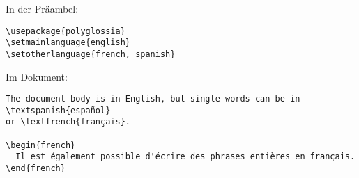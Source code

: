 % 



In der Präambel:
\begin{lstlisting}
\usepackage{polyglossia}
\setmainlanguage{english}
\setotherlanguage{french, spanish}
\end{lstlisting}
Im Dokument:
\begin{lstlisting}
The document body is in English, but single words can be in \textspanish{español}
or \textfrench{français}.

\begin{french}
  Il est également possible d'écrire des phrases entières en français.
\end{french}
\end{lstlisting}